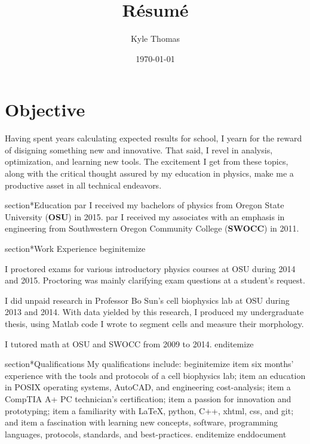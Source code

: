 \documentclass[ notitlepage, prl]{ revtex4-1}
\begin{document}
\author{Kyle Thomas}
\title{R\'esum\'e}
\date{\today}
\maketitle
\section*{Objective}
Having spent years calculating expected results for school, I yearn for the reward of disigning something new and innovative.
That said, I revel in analysis, optimization, and learning new tools. The excitement I get from these topics, along with the critical thought assured by my education in physics, make me a productive asset in all technical endeavors.

section*{Education}
par I received my bachelors of physics from Oregon State University (\textbf {OSU}) in 2015.
par I received my associates with an emphasis in engineering from Southwestern Oregon Community College (\textbf {SWOCC}) in 2011.

section*{Work Experience}
begin{itemize}
\item I proctored exams for various introductory physics courses at OSU during 2014 and 2015.
Proctoring was mainly clarifying exam questions at a student's request.
\item I did unpaid research in Professor Bo Sun's cell biophysics lab at OSU during 2013 and 2014.
With data yielded by this research, I produced my undergraduate thesis, using Matlab code I wrote to segment cells and measure their morphology.
\item I tutored math at OSU and SWOCC from 2009 to 2014.
end{itemize}

section*{Qualifications}
My qualifications include:
begin{itemize}
item six months' experience with the tools and protocols of a cell biophysics lab;
item an education in POSIX operating systems, AutoCAD, and engineering cost-analysis;
item a CompTIA A+ PC technician's certification;
item a passion for innovation and prototyping;
item a familiarity with \LaTeX, python, C++, xhtml, css, and git; and
item a fascination with learning new concepts, software, programming languages, protocols, standards, and best-practices.
end{itemize}
end{document}
\end{document}
